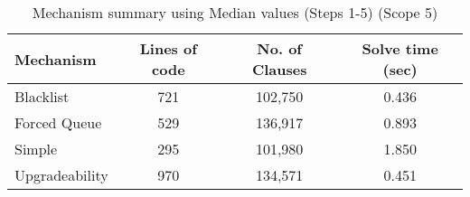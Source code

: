 \begin{table}[htbp]
\centering
\begin{tabular}{|l|c|c|c|}
\hline
\textbf{Mechanism} & \textbf{Lines of code} & \textbf{No. of Clauses} & \textbf{Solve time (sec)} \\
\hline
Blacklist & 721 & 102,750 & 0.436 \\
Forced Queue & 529 & 136,917 & 0.893 \\
Simple & 295 & 101,980 & 1.850 \\
Upgradeability & 970 & 134,571 & 0.451 \\
\hline
\end{tabular}
\caption{Mechanism summary using Median values (Steps 1-5) (Scope 5)}
\label{tab:mechanism_summary_median_steps_5}
\end{table}